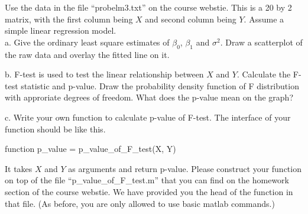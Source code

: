 \documentclass[12pt]{article}
\begin{document}
 {
  Use the data in the file ``probelm3.txt'' on the course webstie. This is a 20 by 2 matrix, with the first column being $X$ and second column being $Y$. Assume a simple linear regression model.\\
 a. Give the ordinary least square estimates of $\beta_0$, $\beta_1$ and $\sigma^2$. Draw a scatterplot of the raw data and overlay the fitted line on it.

 b. F-test is used to test the linear relationship between $X$ and $Y$. Calculate the F-test statistic and p-value. Draw the probability density function of F distribution with approriate degrees of freedom. What does the p-value mean on the graph?

 c. Write your own function to calculate p-value of F-test. The interface of your function should be like this.

\begin{center}
function p\_value = p\_value\_of\_F\_test(X, Y)
\end{center}

It takes $X$ and $Y$ as arguments and return p-value. Please construct your function on top of the file ``p\_value\_of\_F\_test.m'' that you can find on the homework section of the course webstie. We have provided you the head of the function in that file. (As before, you are only allowed to use basic matlab commands.)
}
 { \vfill
  \ANSWER
} {}




\problemsdone
\end{document}
